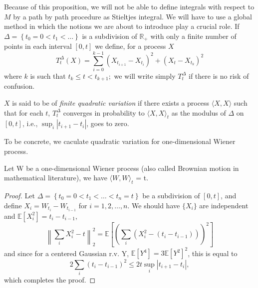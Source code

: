 Because of this proposition, we will not be able to define integrals with respect to $M$ by a path by path procedure as Stieltjes integral. We will have to use a global method in which the notions we are about to introduce play a crucial role. If $\Delta=\left\{t_{0}=0<t_{1}<\ldots\right\}$ is a subdivision of $\mathbb{R}_{+}$ with only a finite number of points in each interval $[0, t]$ we define, for a process $X$ \[ T_{t}^{\Delta}(X)=\sum_{i=0}^{k-1}\left(X_{t_{i+1}}-X_{t_{i}}\right)^{2}+\left(X_{t}-X_{t_{k}}\right)^{2} \] where $k$ is such that $t_{k} \leq t<t_{k+1} ;$ we will write simply $T_{t}^{\Delta}$ if there is no risk of confusion.
\begin{definition}
	$X$ is said to be of \textit{finite quadratic variation} if there exists a process $\langle X, X\rangle$ such that for each $t$,  $T_{t}^{\Delta}$ converges in probability to $\langle X, X\rangle_{t}$ as the modulus of $\Delta$ on $[0, t]$, i.e., $ \sup_i |t_{i+1}-t_i| $, goes to zero.
\end{definition}
To be concrete, we caculate quadratic variation for one-dimensional Wiener process.
\begin{proposition}
	Let W be a one-dimensional Wiener process (also called Brownian motion in mathematical literature), we have $\langle W, W\rangle_t$ = t.
\end{proposition}
\begin{proof}
	Let $\Delta=\left\{t_{0}=0<t_{1}<\ldots<t_n=t\right\}$ be a subdivision of $ [0,t] $, and define $ X_i = W_{t_i}-W_{t_{i-1}} $ for $ i = 1,2,\ldots,n $. We should have $ \{X_i\}$ are independent and $ \mathbb{E}[X_i^2] = t_i-t_{i-1}$,
	\[
	\left\| \sum_{i} X_i^2 - t\right\|_2^2= \mathbb{E}\left[\left( \sum_{i}\left( X_i^2-(t_i-t_{i-1})\right) \right)^2 \right]
	\]
	and since for a centered Gaussian r.v. Y, $ \mathbb{E}[Y^4]=3 \mathbb{E}[Y^2]^2 $, this is equal to
	\[  2\sum_{i}(t_i-t_{i-1})^2\leq 2t \sup_i |t_{i+1}-t_i|,\]
	which completes the proof.
\end{proof}


